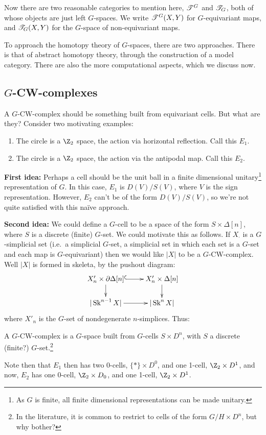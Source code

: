 \documentclass[11pt]{article}
\newcommand{\bluenote}[1]{{\color{blue}#1}\scalebox{.1}{rednote}}
\begin{document}
Now there are two reasonable categories to mention here, $\mathscr{T}^G$ and $\mathscr{T}_G$, both of whose objects are just left $G$-spaces. We write $\mathscr{T}^G(X,Y)$ for $G$-equivariant maps, and $\mathscr{T}_G(X,Y)$ for the $G$-space of non-equivariant maps.

To approach the homotopy theory of $G$-spaces, there are two approaches. There is that of abstract homotopy theory, through the construction of a model category. There are also the more computational aspects, which we discuss now.
\subsection*{$G$-CW-complexes}
A $G$-CW-complex should be something built from equivariant cells. But what are they? Consider two motivating examples:
\begin{enumerate}\squishlist
\item The circle is a $\Z_2$ space, the action via horizontal reflection. Call this $E_1$.
\item The circle is a $\Z_2$ space, the action via the antipodal map. Call this $E_2$.
\end{enumerate}
\textbf{First idea:} Perhaps a cell should be the unit ball in a finite dimensional unitary\footnote{As $G$ is finite, all finite dimensional representations can be made unitary.} representation of $G$.
In this case, $E_1$ is $D(V)/S(V)$, where $V$ is the sign representation. However, $E_2$ can't be of the form $D(V)/S(V)$, so we're not quite satisfied with this na\"ive approach.

\noindent \textbf{Second idea:} We could define a $G$-cell to be a space of the form $S\times \Delta[n]$, where $S$ is a discrete (finite) $G$-set. We could motivate this as follows. If $X_\cdot$ is a $G$-simplicial set (i.e.\ a simplicial $G$-set, a simplicial set in which each set is a $G$-set and each map is $G$-equivariant) then we would like $|X|$ to be a $G$-CW-complex. Well $|X|$ is formed in skeleta, by the pushout diagram:
\[\xymatrix@R=.6cm{
\ar[d]X'_n\times\partial\Delta[n]\ar@{^{(}->}[r]&X'_n\times\Delta[n]\ar[d]\\
|\Skel^{n-1}X|\ar[r]&|\Skel^nX|
}\]
where $X'_n$ is the $G$-set of nondegenerate $n$-simplices. Thus:
\begin{defn*}
A $G$-CW-complex is a $G$-space built from $G$-cells $S\times D^n$, with $S$ a discrete \bluenote{(finite?)} $G$-set.\footnote{In the literature, it is common to restrict to cells of the form $G/H\times D^n$, but why bother?}
\end{defn*}
Note then that $E_1$ then has two $0$-cells, $\{*\}\times D^0$, and one 1-cell, $\Z_2\times D^1$, and now, $E_2$ has one $0$-cell, $\Z_2\times D_0$, and one 1-cell, $\Z_2\times D^1$.
\end{document}
